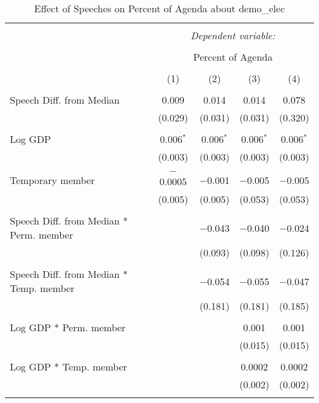 
\begin{table}[!htbp] \centering 
  \caption{Effect of Speeches on Percent of Agenda about  demo_elec} 
  \label{} 
\begin{tabular}{@{\extracolsep{5pt}}lcccc} 
\\[-1.8ex]\hline 
\hline \\[-1.8ex] 
 & \multicolumn{4}{c}{\textit{Dependent variable:}} \\ 
\cline{2-5} 
\\[-1.8ex] & \multicolumn{4}{c}{Percent of Agenda} \\ 
\\[-1.8ex] & (1) & (2) & (3) & (4)\\ 
\hline \\[-1.8ex] 
 Speech Diff. from Median & 0.009 & 0.014 & 0.014 & 0.078 \\ 
  & (0.029) & (0.031) & (0.031) & (0.320) \\ 
  & & & & \\ 
 Log GDP & 0.006$^{*}$ & 0.006$^{*}$ & 0.006$^{*}$ & 0.006$^{*}$ \\ 
  & (0.003) & (0.003) & (0.003) & (0.003) \\ 
  & & & & \\ 
 Temporary member & $-$0.0005 & $-$0.001 & $-$0.005 & $-$0.005 \\ 
  & (0.005) & (0.005) & (0.053) & (0.053) \\ 
  & & & & \\ 
 Speech Diff. from Median * Perm. member &  & $-$0.043 & $-$0.040 & $-$0.024 \\ 
  &  & (0.093) & (0.098) & (0.126) \\ 
  & & & & \\ 
 Speech Diff. from Median * Temp. member &  & $-$0.054 & $-$0.055 & $-$0.047 \\ 
  &  & (0.181) & (0.181) & (0.185) \\ 
  & & & & \\ 
 Log GDP * Perm. member &  &  & 0.001 & 0.001 \\ 
  &  &  & (0.015) & (0.015) \\ 
  & & & & \\ 
 Log GDP * Temp. member &  &  & 0.0002 & 0.0002 \\ 
  &  &  & (0.002) & (0.002) \\ 
  & & & & \\ 

\end{tabular}
\end{table}
